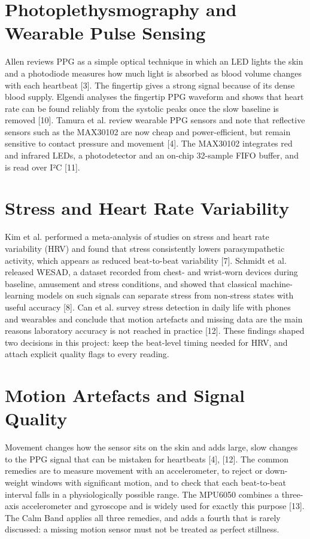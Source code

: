 \documentclass[12pt,letterpaper,oneside]{report}
\begin{document}
\section{Photoplethysmography and Wearable Pulse Sensing}\label{sec:2.2}

Allen reviews PPG as a simple optical technique in which an LED lights the skin and a photodiode measures how much light is absorbed as blood volume changes with each heartbeat [3]. The fingertip gives a strong signal because of its dense blood supply. Elgendi analyses the fingertip PPG waveform and shows that heart rate can be found reliably from the systolic peaks once the slow baseline is removed [10]. Tamura et al. review wearable PPG sensors and note that reflective sensors such as the MAX30102 are now cheap and power-efficient, but remain sensitive to contact pressure and movement [4]. The MAX30102 integrates red and infrared LEDs, a photodetector and an on-chip 32-sample FIFO buffer, and is read over I²C [11].


\section{Stress and Heart Rate Variability}\label{sec:2.3}

Kim et al. performed a meta-analysis of studies on stress and heart rate variability (HRV) and found that stress consistently lowers parasympathetic activity, which appears as reduced beat-to-beat variability [7]. Schmidt et al. released WESAD, a dataset recorded from chest- and wrist-worn devices during baseline, amusement and stress conditions, and showed that classical machine-learning models on such signals can separate stress from non-stress states with useful accuracy [8]. Can et al. survey stress detection in daily life with phones and wearables and conclude that motion artefacts and missing data are the main reasons laboratory accuracy is not reached in practice [12]. These findings shaped two decisions in this project: keep the beat-level timing needed for HRV, and attach explicit quality flags to every reading.


\section{Motion Artefacts and Signal Quality}\label{sec:2.4}

Movement changes how the sensor sits on the skin and adds large, slow changes to the PPG signal that can be mistaken for heartbeats [4], [12]. The common remedies are to measure movement with an accelerometer, to reject or down-weight windows with significant motion, and to check that each beat-to-beat interval falls in a physiologically possible range. The MPU6050 combines a three-axis accelerometer and gyroscope and is widely used for exactly this purpose [13]. The Calm Band applies all three remedies, and adds a fourth that is rarely discussed: a missing motion sensor must not be treated as perfect stillness.
\end{document}
